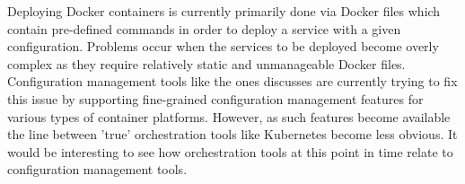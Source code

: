 Deploying Docker containers is currently primarily done via Docker files which contain pre-defined commands in order to deploy a service with a given configuration. Problems occur when the services to be deployed become overly complex as they require relatively static and unmanageable Docker files. Configuration management tools like the ones discusses are currently trying to fix this issue by supporting fine-grained configuration management features for various types of container platforms. However, as such features become available the line between 'true' orchestration tools like Kubernetes become less obvious. It would be interesting to see how orchestration tools at this point in time relate to configuration management tools.
